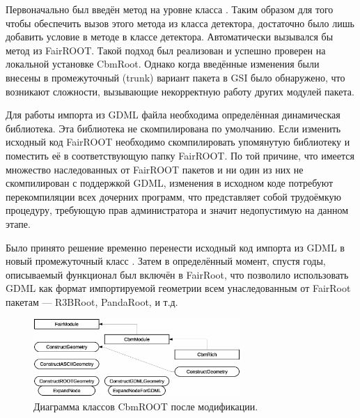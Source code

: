 Первоначально был введён метод  на уровне класса . Таким образом для того чтобы обеспечить вызов этого метода из класса детектора, достаточно было лишь добавить условие в методе  в классе детектора. Автоматически вызывался бы метод из FairROOT. Такой подход был реализован и успешно проверен на локальной установке CbmRoot. Однако когда введённые изменения были внесены в промежуточный (trunk) вариант пакета в GSI было обнаружено, что возникают сложности, вызывающие некорректную работу других модулей пакета.

Для работы импорта из GDML файла необходима определённая динамическая библиотека. Эта библиотека не скомпилирована по умолчанию. Если изменить исходный код FairROOT необходимо скомпилировать упомянутую библиотеку и поместить её в соответствующую папку FairROOT. По той причине, что имеется множество наследованных от FairROOT пакетов и ни один из них не скомпилирован с поддержкой GDML, изменения в исходном коде потребуют перекомпиляции всех дочерних программ, что представляет собой трудоёмкую процедуру, требующую прав администратора и значит недопустимую на данном этапе.

Было принято решение временно перенести исходный код импорта из GDML в новый промежуточный класс . Затем в определённый момент, спустя годы, описываемый функционал был включён в FairRoot, что позволило использовать GDML как формат импортируемой геометрии всем унаследованным от FairRoot пакетам --- R3BRoot, PandaRoot, и т.д.


\begin{figure}[H]
\centering
\includegraphics[width=0.7\textwidth]{pictures/FairModule_classes_after.eps}
\caption{Диаграмма классов CbmROOT после модификации.}
\label{fig:classesAfter}
\end{figure}

